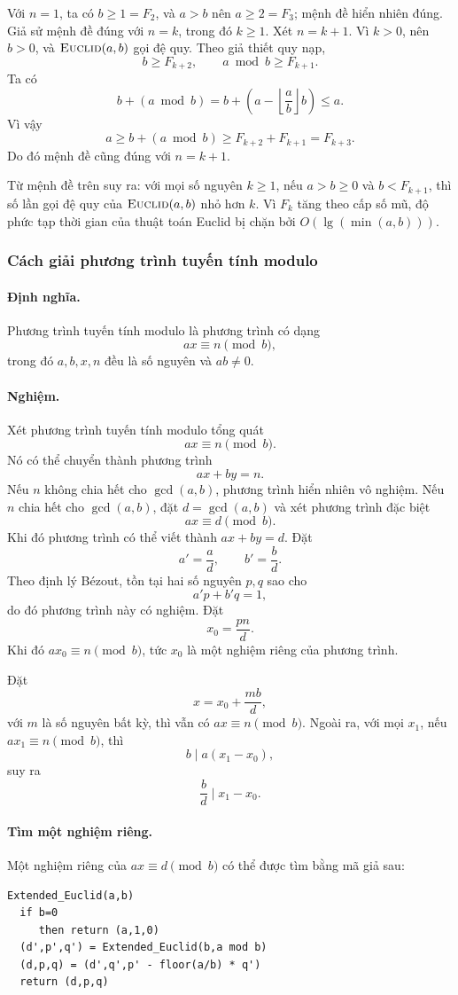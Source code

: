 \documentclass[11pt]{article}
\begin{document}
Với \(n=1\), ta có \(b\ge 1=F_2\), và \(a>b\) nên \(a\ge 2=F_3\); mệnh đề hiển
nhiên đúng. Giả sử mệnh đề đúng với \(n=k\), trong đó \(k\ge 1\). Xét
\(n=k+1\). Vì \(k>0\), nên \(b>0\), và \(\textsc{Euclid}(a,b)\) gọi đệ quy.
Theo giả thiết quy nạp,
\[
  b\ge F_{k+2},\qquad a\bmod b\ge F_{k+1}.
\]
Ta có
\[
  b+(a\bmod b)
  = b+\left(a-\left\lfloor\frac ab\right\rfloor b\right)
  \le a.
\]
Vì vậy
\[
  a\ge b+(a\bmod b)\ge F_{k+2}+F_{k+1}=F_{k+3}.
\]
Do đó mệnh đề cũng đúng với \(n=k+1\).

Từ mệnh đề trên suy ra: với mọi số nguyên \(k\ge 1\), nếu \(a>b\ge 0\) và
\(b<F_{k+1}\), thì số lần gọi đệ quy của \(\textsc{Euclid}(a,b)\) nhỏ hơn
\(k\). Vì \(F_k\) tăng theo cấp số mũ, độ phức tạp thời gian của thuật toán
Euclid bị chặn bởi \(O(\lg(\min(a,b)))\).

\subsubsection{Cách giải phương trình tuyến tính modulo}

\paragraph{Định nghĩa.}
Phương trình tuyến tính modulo là phương trình có dạng
\[
  ax\equiv n\pmod b,
\]
trong đó \(a,b,x,n\) đều là số nguyên và \(ab\ne 0\).

\paragraph{Nghiệm.}
Xét phương trình tuyến tính modulo tổng quát
\[
  ax\equiv n\pmod b.
\]
Nó có thể chuyển thành phương trình
\[
  ax+by=n.
\]
Nếu \(n\) không chia hết cho \(\gcd(a,b)\), phương trình hiển nhiên vô nghiệm.
Nếu \(n\) chia hết cho \(\gcd(a,b)\), đặt \(d=\gcd(a,b)\) và xét phương trình
đặc biệt
\[
  ax\equiv d\pmod b.
\]
Khi đó phương trình có thể viết thành \(ax+by=d\). Đặt
\[
  a'=\frac ad,\qquad b'=\frac bd.
\]
Theo định lý Bézout, tồn tại hai số nguyên \(p,q\) sao cho
\[
  a'p+b'q=1,
\]
do đó phương trình này có nghiệm. Đặt
\[
  x_0=\frac{pn}{d}.
\]
Khi đó \(ax_0\equiv n\pmod b\), tức \(x_0\) là một nghiệm riêng của phương
trình.

Đặt
\[
  x=x_0+\frac{mb}{d},
\]
với \(m\) là số nguyên bất kỳ, thì vẫn có \(ax\equiv n\pmod b\). Ngoài ra,
với mọi \(x_1\), nếu \(ax_1\equiv n\pmod b\), thì
\[
  b\mid a(x_1-x_0),
\]
suy ra
\[
  \frac bd\mid x_1-x_0.
\]

\paragraph{Tìm một nghiệm riêng.}
Một nghiệm riêng của \(ax\equiv d\pmod b\) có thể được tìm bằng mã giả sau:
\begin{verbatim}
Extended_Euclid(a,b)
  if b=0
     then return (a,1,0)
  (d',p',q') = Extended_Euclid(b,a mod b)
  (d,p,q) = (d',q',p' - floor(a/b) * q')
  return (d,p,q)
\end{verbatim}
\end{document}
